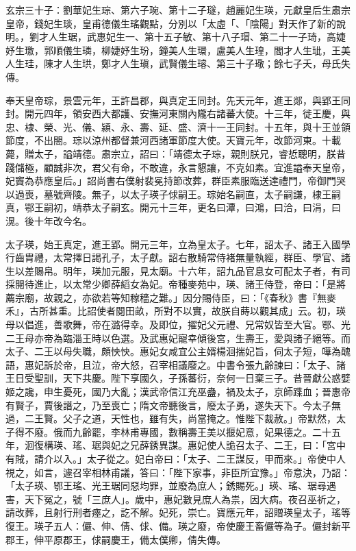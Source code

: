 
\begin{pinyinscope}

 玄宗三十子：劉華妃生琮、第六子琬、第十二子璲，趙麗妃生瑛，元獻皇后生肅宗皇帝，錢妃生琰，皇甫德儀生瑤觀點，分別以「太虛「、「陰陽」對天作了新的說明。，劉才人生琚，武惠妃生一、第十五子敏、第十八子瑁、第二十一子琦，高婕妤生璬，郭順儀生璘，柳婕妤生玢，鐘美人生環，盧美人生瑝，閻才人生玼，王美人生珪，陳才人生珙，鄭才人生瑱，武賢儀生璿、第三十子璥；餘七子夭，母氏失傳。



 奉天皇帝琮，景雲元年，王許昌郡，與真定王同封。先天元年，進王郯，與郢王同封。開元四年，領安西大都護、安撫河東關內隴右諸蕃大使。十三年，徙王慶，與忠、棣、榮、光、儀、潁、永、壽、延、盛、濟十一王同封。十五年，與十王並領節度，不出閤。琮以涼州都督兼河西諸軍節度大使。天寶元年，改節河東。十載薨，贈太子，謚靖德。肅宗立，詔曰：「靖德太子琮，親則朕兄，睿悊聰明，朕昔踐儲極，顧誠非次，君父有命，不敢違，永言懇讓，不克如素。宜進謚奉天皇帝，妃竇為恭應皇后。」詔尚書右僕射裴冕持節改葬，群臣素服臨送達禮門，帝御門哭以過喪，墓號齊陵。無子，以太子瑛子俅嗣王。琮始名嗣直，太子嗣謙，棣王嗣真，鄂王嗣初，靖恭太子嗣玄。開元十三年，更名曰潭，曰鴻，曰洽，曰涓，曰滉。後十年改今名。



 太子瑛，始王真定，進王郢。開元三年，立為皇太子。七年，詔太子、諸王入國學行齒胄禮，太常擇日謁孔子，太子獻。詔右散騎常侍褚無量執經，群臣、學官、諸生以差賜帛。明年，瑛加元服，見太廟。十六年，詔九品官息女可配太子者，有司採閱待進止，以太常少卿薛縚女為妃。帝種麥苑中，瑛、諸王侍登，帝曰：「是將薦宗廟，故親之，亦欲若等知稼穡之難。」因分賜侍臣，曰：「《春秋》書『無麥禾』，古所甚重。比詔使者閱田畝，所對不以實，故朕自蒔以觀其成」云。初，瑛母以倡進，善歌舞，帝在潞得幸。及即位，擢妃父元禮、兄常奴皆至大官。鄂、光二王母亦帝為臨淄王時以色選。及武惠妃寵幸傾後宮，生壽王，愛與諸子絕等。而太子、二王以母失職，頗怏怏。惠妃女咸宜公主婿楊洄揣妃旨，伺太子短，嘩為醜語，惠妃訴於帝，且泣，帝大怒，召宰相議廢之。中書令張九齡諫曰：「太子、諸王日受聖訓，天下共慶。陛下享國久，子孫蕃衍，奈何一日棄三子。昔晉獻公惑嬖姬之讒，申生憂死，國乃大亂；漢武帝信江充巫蠱，禍及太子，京師蹀血；晉惠帝有賢子，賈後譖之，乃至喪亡；隋文帝聽後言，廢太子勇，遂失天下。今太子無過，二王賢。父子之道，天性也，雖有失，尚當掩之。惟陛下裁赦。」帝默然，太子得不廢。俄而九齡罷，李林甫專國，數稱壽王美以揠妃意，妃果德之。二十五年，洄復構瑛、瑤、琚與妃之兄薛銹異謀。惠妃使人詭召太子、二王，曰：「宮中有賊，請介以入。」太子從之。妃白帝曰：「太子、二王謀反，甲而來。」帝使中人視之，如言，遽召宰相林甫議，答曰：「陛下家事，非臣所宜豫。」帝意決，乃詔：「太子瑛、鄂王瑤、光王琚同惡均罪，並廢為庶人；銹賜死。」瑛、瑤、琚尋遇害，天下冤之，號「三庶人」。歲中，惠妃數見庶人為祟，因大病。夜召巫祈之，請改葬，且射行刑者瘞之，訖不解。妃死，崇亡。寶應元年，詔贈瑛皇太子，瑤等復王。瑛子五人：儼、伸、倩、俅、備。瑛之廢，帝使慶王畜儼等為子。儼封新平郡王，伸平原郡王，俅嗣慶王，備太僕卿，倩失傳。




\end{pinyinscope}
